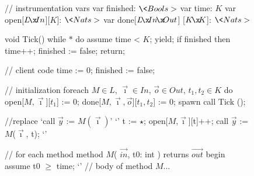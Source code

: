\begin{figure}[t] %
	\scriptsize
  \begin{minipage}[t]{38mm}
    \lstset{numbers=left, 
            numberstyle=\tiny\tt, 
            stepnumber=1, 
            firstnumber=1,
            numbersep=4pt}
    \begin{program}
// instrumentation vars
var finished: $\<Bools>$
var time: $K$
var open[$L\!\x\!In$][$K$]: $\<Nats>$
var done[$L\!\x\!In\!\x\!Out$]
  [$K\!\x\!K$]: $\<Nats>$

void Tick()
  while $\ast$ do
    assume time < $K$;
    yield;
    if finished then
        time++;
        finished := false;
  return;
    \end{program}
  \end{minipage}
  \begin{minipage}[t]{40mm}
    \lstset{numbers=left, 
            numberstyle=\tiny\tt, 
            stepnumber=1, 
            firstnumber=last,
            numbersep=4pt}
    \begin{program}
// client code
time := 0;
finished := false;

// initialization
foreach $M\in L$, $\vec{\imath}\in In$, 
    $\vec{o} \in Out$, $t_1, t_2 \in K$ do
  open[$M,\vec{\imath}$][$t_1$] := 0;
  done[$M,\vec{\imath},\vec{o}$][$t_1,t_2$] := 0;
spawn call Tick ();

//replace `call $\vec{y}$ := $M(\vec{\imath})$' `\label{pgm:harness:begin}'
t := $\star$;
open[$M$,$\vec{\imath}$][t]++;
call $\vec{y}$ := $M$($\vec{\imath}$, t); `\label{pgm:harness:end}'
    \end{program}
    \end{minipage}
    \begin{minipage}[t]{42mm}
    \lstset{numbers=left, 
            numberstyle=\tiny\tt, 
            stepnumber=1, 
            firstnumber=last,
            numbersep=4pt}
    \begin{program}
// for each method
method $M$( $\vec{in}$, t0: int ) 
  returns $\vec{out}$
begin
  assume t0 $\ge$ time; `\label{pgm:method:start}'
  // body of method $M$...


\end{program}
\end{minipage}
\end{figure}
